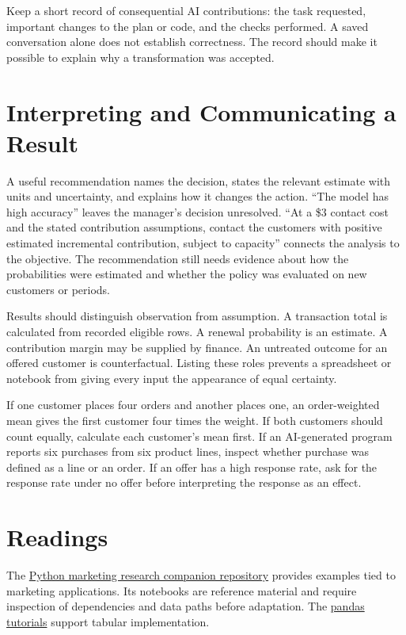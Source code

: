 Keep a short record of consequential AI contributions: the task
requested, important changes to the plan or code, and the checks
performed. A saved conversation alone does not establish correctness.
The record should make it possible to explain why a transformation was
accepted.

\hypertarget{M01-interpreting-and-communicating-a-result}{%
\section{Interpreting and Communicating a
Result}\label{M01-interpreting-and-communicating-a-result}}

\noindent A useful recommendation names the decision, states the relevant estimate
with units and uncertainty, and explains how it changes the action.
``The model has high accuracy'' leaves the manager's decision
unresolved. ``At a \$3 contact cost and the stated contribution
assumptions, contact the customers with positive estimated incremental
contribution, subject to capacity'' connects the analysis to the
objective. The recommendation still needs evidence about how the
probabilities were estimated and whether the policy was evaluated on new
customers or periods.

Results should distinguish observation from assumption. A transaction
total is calculated from recorded eligible rows. A renewal probability
is an estimate. A contribution margin may be supplied by finance. An
untreated outcome for an offered customer is counterfactual. Listing
these roles prevents a spreadsheet or notebook from giving every input
the appearance of equal certainty.

If one customer places four orders and another places one, an
order-weighted mean gives the first customer four times the weight. If
both customers should count equally, calculate each customer's mean
first. If an AI-generated program reports six purchases from six product
lines, inspect whether purchase was defined as a line or an order. If an
offer has a high response rate, ask for the response rate under no offer
before interpreting the response as an effect.

\hypertarget{M01-readings}{%
\section{Readings}\label{M01-readings}}

\noindent The
\href{https://github.com/python-marketing-research/python-marketing-research-1ed}{Python
marketing research companion repository} provides examples tied to
marketing applications. Its notebooks are reference material and require
inspection of dependencies and data paths before adaptation. The
\href{https://pandas.pydata.org/docs/getting_started/intro_tutorials/}{pandas
tutorials} support tabular implementation.

